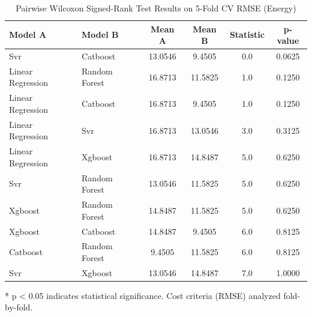 \begin{table}[htbp]
\centering
\caption{Pairwise Wilcoxon Signed-Rank Test Results on 5-Fold CV RMSE (Energy)}
\label{tab:wilcoxon_energy}
\begin{tabular}{llcccc}
\toprule
\textbf{Model A} & \textbf{Model B} & \textbf{Mean A} & \textbf{Mean B} & \textbf{Statistic} & \textbf{p-value} \\
\midrule
Svr & Catboost & 13.0546 & 9.4505 & 0.0 & 0.0625 \\
Linear Regression & Random Forest & 16.8713 & 11.5825 & 1.0 & 0.1250 \\
Linear Regression & Catboost & 16.8713 & 9.4505 & 1.0 & 0.1250 \\
Linear Regression & Svr & 16.8713 & 13.0546 & 3.0 & 0.3125 \\
Linear Regression & Xgboost & 16.8713 & 14.8487 & 5.0 & 0.6250 \\
Svr & Random Forest & 13.0546 & 11.5825 & 5.0 & 0.6250 \\
Xgboost & Random Forest & 14.8487 & 11.5825 & 5.0 & 0.6250 \\
Xgboost & Catboost & 14.8487 & 9.4505 & 6.0 & 0.8125 \\
Catboost & Random Forest & 9.4505 & 11.5825 & 6.0 & 0.8125 \\
Svr & Xgboost & 13.0546 & 14.8487 & 7.0 & 1.0000 \\
\bottomrule
\end{tabular}
\footnotesize{* p < 0.05 indicates statistical significance. Cost criteria (RMSE) analyzed fold-by-fold.}
\end{table}